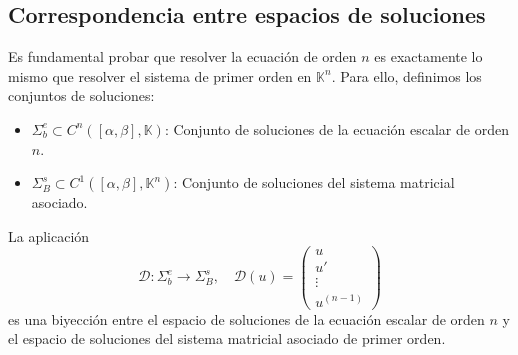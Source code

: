 \subsection{Correspondencia entre espacios de soluciones}

Es fundamental probar que resolver la ecuación de orden $n$ es exactamente lo mismo que resolver el sistema de primer orden en $\mathbb{K}^n$. Para ello, definimos los conjuntos de soluciones:
\begin{itemize}
    \item $\Sigma_b^e \subset C^n([\alpha, \beta], \mathbb{K})$: Conjunto de soluciones de la ecuación escalar de orden $n$.
    \item $\Sigma_B^s \subset C^1([\alpha, \beta], \mathbb{K}^n)$: Conjunto de soluciones del sistema matricial asociado.
\end{itemize}

\begin{lema}
    La aplicación 
    \[
        \mathcal{D} : \Sigma_b^e \to \Sigma_B^s, \quad \mathcal{D}(u) = \begin{pmatrix} u \\ u' \\ \vdots \\ u^{(n-1)} \end{pmatrix}
    \]
    es una biyección entre el espacio de soluciones de la ecuación escalar de orden $n$ y el espacio de soluciones del sistema matricial asociado de primer orden. \label{Lema:isomorfismoDiferenciacion}
\end{lema}


